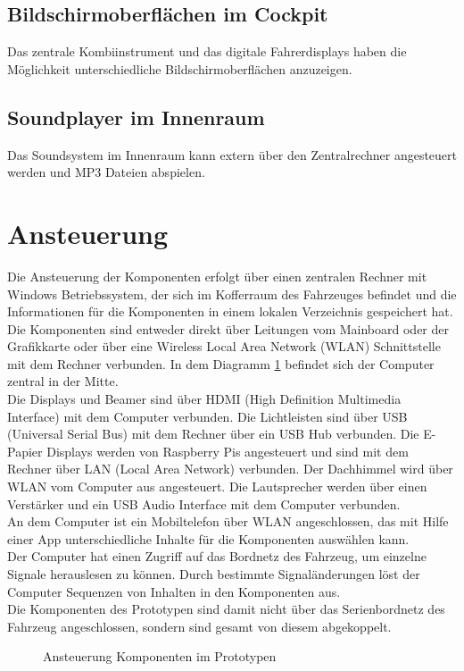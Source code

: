\subsection{Bildschirmoberflächen im Cockpit}
Das zentrale Kombiinstrument und das digitale Fahrerdisplays haben die Möglichkeit unterschiedliche Bildschirmoberflächen anzuzeigen.
\subsection{Soundplayer im Innenraum}
Das Soundsystem im Innenraum kann extern über den Zentralrechner angesteuert werden und MP3 Dateien abspielen.
\section{Ansteuerung}
Die Ansteuerung der Komponenten erfolgt über einen zentralen Rechner mit Windows Betriebssystem, der sich im Kofferraum des Fahrzeuges befindet und die Informationen für die Komponenten in einem lokalen Verzeichnis gespeichert hat. Die Komponenten sind entweder direkt über Leitungen vom Mainboard oder der Grafikkarte oder über eine Wireless Local Area Network (WLAN) Schnittstelle mit dem Rechner verbunden. In dem Diagramm \ref{fig:tikz_ansteuerung} befindet sich der Computer zentral in der Mitte.\\
Die Displays und Beamer sind über HDMI (High Definition Multimedia Interface) mit dem Computer verbunden. Die Lichtleisten sind über USB (Universal Serial Bus) mit dem Rechner über ein USB Hub verbunden. Die E-Papier Displays werden von Raspberry Pis angesteuert und sind mit dem Rechner über LAN (Local Area Network) verbunden. Der Dachhimmel wird über WLAN vom Computer aus angesteuert. Die Lautsprecher werden über einen Verstärker und ein USB Audio Interface mit dem Computer verbunden.\\
An dem Computer ist ein Mobiltelefon über WLAN angeschlossen, das mit Hilfe einer App unterschiedliche Inhalte für die Komponenten auswählen kann.\\
Der Computer hat einen Zugriff auf das Bordnetz des Fahrzeug, um einzelne Signale herauslesen zu können. Durch bestimmte Signaländerungen löst der Computer Sequenzen von Inhalten in den Komponenten aus.\\
Die Komponenten des Prototypen sind damit nicht über das Serienbordnetz des Fahrzeug angeschlossen, sondern sind gesamt von diesem abgekoppelt.
\begin{figure}[hbt]
	\centering
	
	\caption[Ansteuerung Komponenten im Prototypen]{Ansteuerung Komponenten im Prototypen}
	\label{fig:tikz_ansteuerung}
\end{figure}